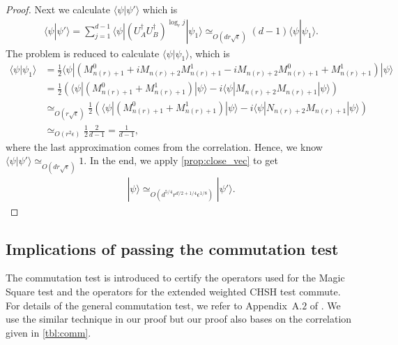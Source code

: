 \documentclass[11pt,letterpaper]{article}
\newcommand{\ket}[1]{|#1\rangle}
\newcommand{\bra}[1]{\langle#1|}
\newcommand{\braket}[2]{\langle#1|#2\rangle}
\newcommand{\ct}{^{\dagger}}
\newcommand{\1}{\mathbb{1}}
\newcommand{\nr}{n(r)}
\newcommand{\ep}{\epsilon}
\newcommand{\se}{\sqrt{\epsilon}}
\newcommand{\appd}[1]{\simeq_{#1}}
\theoremstyle{definition}
\begin{document}
\begin{proof}
	Next we calculate $\braket{\psi}{\psi'}$ which is
	\begin{align*}
		\braket{\psi}{\psi'} = \sum_{j=1}^{d-1} \bra{\psi} (U_A\ct U_B\ct)^{\log_r j} \ket{\psi_1}
		 \appd{O(dr\se)} (d-1) \braket{\psi}{\psi_1}.
	\end{align*}
	The problem is reduced to calculate $\braket{\psi}{\psi_1}$, which is
	\begin{align*}
		\braket{\psi}{\psi_1} &= \frac{1}{2} \bra{\psi} (M_{\nr+1}^0 + iM_{\nr+2}M_{\nr+1}^1 - iM_{\nr+2}M_{\nr+1}^0 +M_{\nr+1}^1) \ket{\psi}\\
		& = \frac{1}{2} \left(\bra{\psi}(M_{\nr+1}^0 + M_{\nr+1}^1) \ket{\psi} - i \bra{\psi}M_{\nr+2}M_{\nr+1} \ket{\psi} \right)\\
		& \appd{O(r\se)} \frac{1}{2} \left(\bra{\psi}(M_{\nr+1}^0 + M_{\nr+1}^1) \ket{\psi}  - i \bra{\psi}N_{\nr+2}M_{\nr+1} \ket{\psi} \right)\\
		& \appd{O(r^2 \ep)} \frac{1}{2} \frac{2}{d-1} = \frac{1}{d-1},
	\end{align*}
	where the last approximation comes from the correlation.
	Hence, we know $\braket{\psi}{\psi'} \appd{O(d r \se)} 1$.
	In the end, we apply \cref{prop:close_vec} to get
	\begin{align}
		\ket{\psi} \appd{O(d^{5/4} r^{d/2+1/4} \ep^{1/8})} \ket{\psi'}.
	\end{align}
\end{proof}


\subsection{Implications of passing the commutation test}
\label{sec:imp_comm}
The commutation test is introduced to certify the operators used for the Magic Square test and 
the operators for the extended weighted CHSH test commute. For details of the general commutation test, 
we refer to Appendix~A.$2$ of \cite{coladan2017verifier}. 
We use the similar technique in our proof but our proof also bases on the correlation given in \cref{tbl:comm}.
\end{document}
